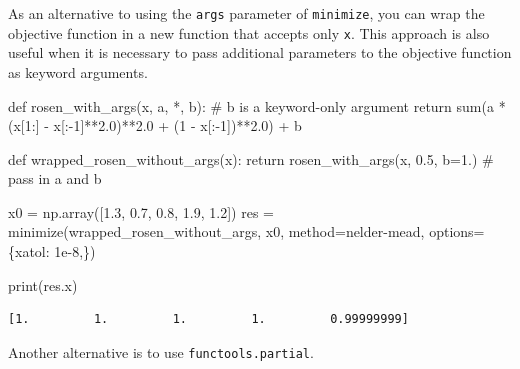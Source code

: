 \documentclass[
  letterpaper,
  DIV=11,
  numbers=noendperiod]{scrreprt}
\newenvironment{Shaded}{\begin{snugshade}}{\end{snugshade}}
\newcommand{\BuiltInTok}[1]{\textcolor[rgb]{0.00,0.23,0.31}{#1}}
\newcommand{\CommentTok}[1]{\textcolor[rgb]{0.37,0.37,0.37}{#1}}
\newcommand{\ControlFlowTok}[1]{\textcolor[rgb]{0.00,0.23,0.31}{#1}}
\newcommand{\DecValTok}[1]{\textcolor[rgb]{0.68,0.00,0.00}{#1}}
\newcommand{\FloatTok}[1]{\textcolor[rgb]{0.68,0.00,0.00}{#1}}
\newcommand{\KeywordTok}[1]{\textcolor[rgb]{0.00,0.23,0.31}{#1}}
\newcommand{\NormalTok}[1]{\textcolor[rgb]{0.00,0.23,0.31}{#1}}
\newcommand{\OperatorTok}[1]{\textcolor[rgb]{0.37,0.37,0.37}{#1}}
\newcommand{\StringTok}[1]{\textcolor[rgb]{0.13,0.47,0.30}{#1}}
\begin{document}
As an alternative to using the \texttt{args} parameter of
\texttt{minimize}, you can wrap the objective function in a new function
that accepts only \texttt{x}. This approach is also useful when it is
necessary to pass additional parameters to the objective function as
keyword arguments.

\begin{Shaded}
\begin{Highlighting}[]
\KeywordTok{def}\NormalTok{ rosen\_with\_args(x, a, }\OperatorTok{*}\NormalTok{, b):  }\CommentTok{\# b is a keyword{-}only argument}
    \ControlFlowTok{return} \BuiltInTok{sum}\NormalTok{(a }\OperatorTok{*}\NormalTok{ (x[}\DecValTok{1}\NormalTok{:] }\OperatorTok{{-}}\NormalTok{ x[:}\OperatorTok{{-}}\DecValTok{1}\NormalTok{]}\OperatorTok{**}\FloatTok{2.0}\NormalTok{)}\OperatorTok{**}\FloatTok{2.0} \OperatorTok{+}\NormalTok{ (}\DecValTok{1} \OperatorTok{{-}}\NormalTok{ x[:}\OperatorTok{{-}}\DecValTok{1}\NormalTok{])}\OperatorTok{**}\FloatTok{2.0}\NormalTok{) }\OperatorTok{+}\NormalTok{ b}

\KeywordTok{def}\NormalTok{ wrapped\_rosen\_without\_args(x):}
    \ControlFlowTok{return}\NormalTok{ rosen\_with\_args(x, }\FloatTok{0.5}\NormalTok{, b}\OperatorTok{=}\FloatTok{1.}\NormalTok{)  }\CommentTok{\# pass in \textasciigrave{}a\textasciigrave{} and \textasciigrave{}b\textasciigrave{}}

\NormalTok{x0 }\OperatorTok{=}\NormalTok{ np.array([}\FloatTok{1.3}\NormalTok{, }\FloatTok{0.7}\NormalTok{, }\FloatTok{0.8}\NormalTok{, }\FloatTok{1.9}\NormalTok{, }\FloatTok{1.2}\NormalTok{])}
\NormalTok{res }\OperatorTok{=}\NormalTok{ minimize(wrapped\_rosen\_without\_args, x0, method}\OperatorTok{=}\StringTok{\textquotesingle{}nelder{-}mead\textquotesingle{}}\NormalTok{,}
\NormalTok{               options}\OperatorTok{=}\NormalTok{\{}\StringTok{\textquotesingle{}xatol\textquotesingle{}}\NormalTok{: }\FloatTok{1e{-}8}\NormalTok{,\})}

\BuiltInTok{print}\NormalTok{(res.x)}
\end{Highlighting}
\end{Shaded}

\begin{verbatim}
[1.         1.         1.         1.         0.99999999]
\end{verbatim}

Another alternative is to use \texttt{functools.partial}.
\end{document}

